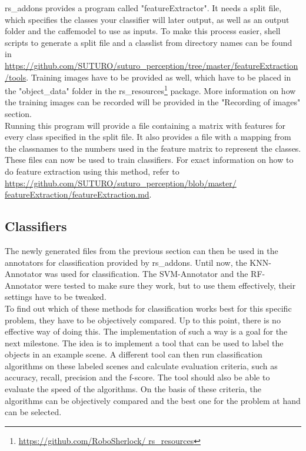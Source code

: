 \documentclass[main.tex]{subfiles}
\begin{document}
		    rs\_addons provides a program called "featureExtractor". It needs a split file, which specifies the classes your classifier will later output, as well 				as an output folder and the caffemodel to use as inputs. To make this process easier, shell scripts to generate a split file and a classlist from 					directory names can be found in \url{https://github.com/SUTURO/suturo_perception/tree/master/featureExtraction/tools}. Training images have to be 					provided as well, which have to be placed in the "object\_data" folder in the rs\_resources\footnote{\url{https://github.com/RoboSherlock/							rs_resources}} package. More information on how the training images can be recorded will be provided in the "Recording of images" section.\\
		    
		     Running this program will provide a file containing a matrix with features for every class specified in the split file. It also provides a file with a 			mapping from the classnames to the numbers used in the feature matrix to represent the classes. These files can now be used to train classifiers. For 				exact information on how to do feature extraction using this method, refer to \url{https://github.com/SUTURO/suturo_perception/blob/master/							featureExtraction/featureExtraction.md}. 
			
			\subsection{Classifiers}
			The newly generated files from the previous section can then be used in the annotators for classification provided by rs\_addons. Until now, the KNN-					Annotator was used for classification. The SVM-Annotator and the RF-Annotator were tested to make sure they work, but to use them effectively, their 					settings have to be tweaked.\\
			
			To find out which of these methods for classification works best for this specific problem, they have to be objectively compared. Up to this point, 					there is no effective way of doing this. The implementation of such a way is a goal for the next milestone. The idea is to implement a tool that 						can be used to label the objects in an example scene. A different tool can then run classification algorithms on these labeled scenes and calculate 					evaluation criteria, such as accuracy, recall, precision and the f-score. The tool should also be able to evaluate the speed of the algorithms. On the 				basis of these criteria, the algorithms can be objectively compared and the best one for the problem at hand can be selected.
			
\end{document}
